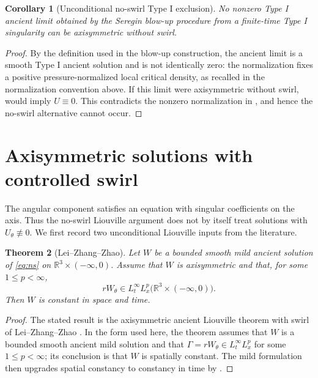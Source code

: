 \documentclass[11pt]{amsart}
\theoremstyle{plain}
\newtheorem{theorem}{Theorem}[section]
\newtheorem{corollary}[theorem]{Corollary}
\theoremstyle{definition}
\theoremstyle{remark}
\numberwithin{equation}{section}
\begin{document}
\begin{corollary}[Unconditional no-swirl Type I exclusion]
\label{cor:no-swirl-exclusion}
No nonzero Type I ancient limit obtained by the Seregin blow-up procedure from
a finite-time Type I singularity can be axisymmetric without swirl.
\end{corollary}

\begin{proof}
By the definition used in the blow-up construction, the ancient limit is a
smooth Type I ancient solution and is not identically zero: the normalization
fixes a positive pressure-normalized local critical density, as recalled in the
normalization convention above.  If this limit
were axisymmetric without swirl,
 would imply \(U\equiv0\).  This contradicts the
nonzero normalization in , and hence the
no-swirl alternative cannot occur.
\end{proof}

\section{Axisymmetric solutions with controlled swirl}

The angular component satisfies an equation with singular coefficients on the
axis.  Thus the no-swirl Liouville argument does not by itself treat solutions
with \(U_\theta\not\equiv0\).  We first record two unconditional Liouville
inputs from the literature.

\begin{theorem}[Lei--Zhang--Zhao]\label{thm:lzz}
Let \(W\) be a bounded smooth mild ancient solution of \eqref{eq:ns} on
\(\mathbb R^3\times(-\infty,0)\).  Assume that \(W\) is axisymmetric and that,
for some \(1\le p<\infty\),
\[
   rW_\theta\in L_t^\infty L_x^p
      \bigl(\mathbb R^3\times(-\infty,0)\bigr).
\]
Then \(W\) is constant in space and time.
\end{theorem}

\begin{proof}
The stated result is the axisymmetric ancient Liouville theorem with swirl of
Lei--Zhang--Zhao \cite{LZZ2017}.  In the form used here, the theorem assumes
that \(W\) is a bounded smooth ancient mild solution and that
\(\Gamma=rW_\theta\in L_t^\infty L_x^p\) for some \(1\le p<\infty\); its
conclusion is that \(W\) is spatially constant.  The mild formulation then
upgrades spatial constancy to constancy in time by
.
\end{proof}
\end{document}
